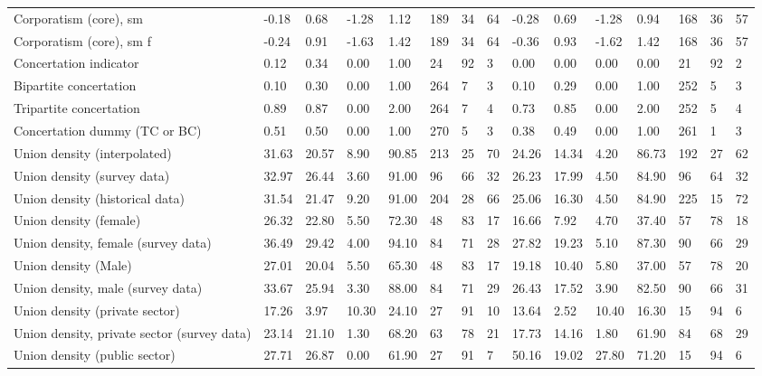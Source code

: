 \begin{longtable}{lllllllllllllll}
\addlinespace
Corporatism (core), sm & -0.18 & 0.68 & -1.28 & 1.12 & 189 & 34 & 64 & -0.28 & 0.69 & -1.28 & 0.94 & 168 & 36 & 57\\
Corporatism (core), sm f & -0.24 & 0.91 & -1.63 & 1.42 & 189 & 34 & 64 & -0.36 & 0.93 & -1.62 & 1.42 & 168 & 36 & 57\\
Concertation indicator & 0.12 & 0.34 & 0.00 & 1.00 & 24 & 92 & 3 & 0.00 & 0.00 & 0.00 & 0.00 & 21 & 92 & 2\\
Bipartite concertation & 0.10 & 0.30 & 0.00 & 1.00 & 264 & 7 & 3 & 0.10 & 0.29 & 0.00 & 1.00 & 252 & 5 & 3\\
Tripartite concertation & 0.89 & 0.87 & 0.00 & 2.00 & 264 & 7 & 4 & 0.73 & 0.85 & 0.00 & 2.00 & 252 & 5 & 4\\
\addlinespace
Concertation dummy (TC or BC) & 0.51 & 0.50 & 0.00 & 1.00 & 270 & 5 & 3 & 0.38 & 0.49 & 0.00 & 1.00 & 261 & 1 & 3\\
Union density (interpolated) & 31.63 & 20.57 & 8.90 & 90.85 & 213 & 25 & 70 & 24.26 & 14.34 & 4.20 & 86.73 & 192 & 27 & 62\\
Union density (survey data) & 32.97 & 26.44 & 3.60 & 91.00 & 96 & 66 & 32 & 26.23 & 17.99 & 4.50 & 84.90 & 96 & 64 & 32\\
Union density (historical data) & 31.54 & 21.47 & 9.20 & 91.00 & 204 & 28 & 66 & 25.06 & 16.30 & 4.50 & 84.90 & 225 & 15 & 72\\
Union density (female) & 26.32 & 22.80 & 5.50 & 72.30 & 48 & 83 & 17 & 16.66 & 7.92 & 4.70 & 37.40 & 57 & 78 & 18\\
\addlinespace
Union density, female (survey data) & 36.49 & 29.42 & 4.00 & 94.10 & 84 & 71 & 28 & 27.82 & 19.23 & 5.10 & 87.30 & 90 & 66 & 29\\
Union density (Male) & 27.01 & 20.04 & 5.50 & 65.30 & 48 & 83 & 17 & 19.18 & 10.40 & 5.80 & 37.00 & 57 & 78 & 20\\
Union density, male (survey data) & 33.67 & 25.94 & 3.30 & 88.00 & 84 & 71 & 29 & 26.43 & 17.52 & 3.90 & 82.50 & 90 & 66 & 31\\
Union density (private sector) & 17.26 & 3.97 & 10.30 & 24.10 & 27 & 91 & 10 & 13.64 & 2.52 & 10.40 & 16.30 & 15 & 94 & 6\\
Union density, private sector (survey data) & 23.14 & 21.10 & 1.30 & 68.20 & 63 & 78 & 21 & 17.73 & 14.16 & 1.80 & 61.90 & 84 & 68 & 29\\
\addlinespace
Union density (public sector) & 27.71 & 26.87 & 0.00 & 61.90 & 27 & 91 & 7 & 50.16 & 19.02 & 27.80 & 71.20 & 15 & 94 & 6\\

\end{longtable}
